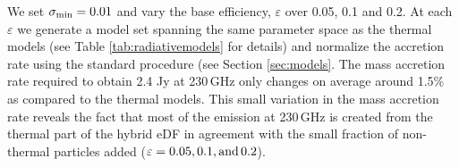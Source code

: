 We set $\sigma_{\rm min}=0.01$ and vary the base efficiency, $\varepsilon$ over 0.05, 0.1 and 0.2.  At each $\varepsilon$ we generate a model set spanning the same parameter space as the thermal models (see Table \ref{tab:radiativemodels} for details) and normalize the accretion rate using the standard procedure (see Section \ref{sec:models}. The mass accretion rate required to obtain 2.4 Jy at 230\,GHz only changes on average around 1.5\% as compared to the thermal models. This small variation in the mass accretion rate reveals the fact that most of the emission at 230\,GHz is created from the thermal part of the hybrid eDF in agreement with the small fraction of non-thermal particles added ($\varepsilon=0.05,0.1,\rm{and}\,0.2$).




